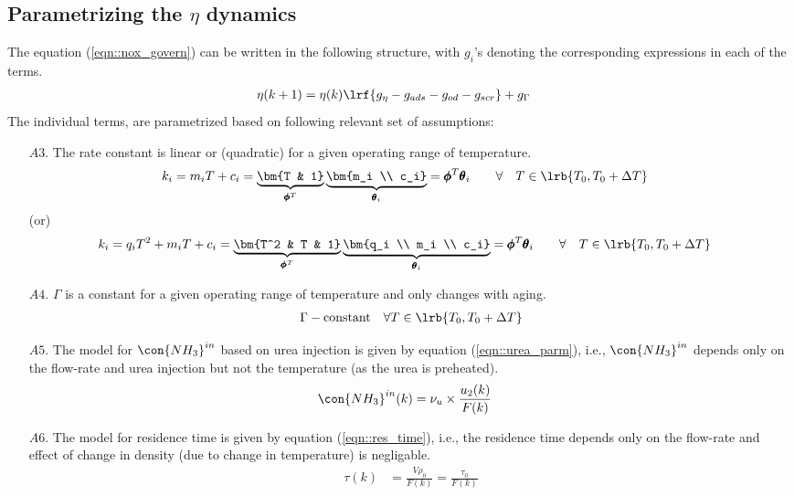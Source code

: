 \subsection{Parametrizing the $\eta$ dynamics}
The equation (\ref{eqn::nox_govern}) can be written in the following structure, with $g_i$'s denoting the corresponding expressions in each of the terms.
\begin{align}
        \eta(k+1) &= \eta(k) \lrf{ g_{\eta} - g_{ads} - g_{od} - g_{scr}} + g_\Gamma
\end{align}
The individual terms, are parametrized based on following relevant set of assumptions:
\begin{itemize}
        \item[$A3.$] The rate constant is linear or (quadratic) for a given operating range of temperature.
        \begin{align}
                k_i &= m_i T + c_i = \underbrace{\bm{T & 1}}_{\pmb \phi^T} \underbrace{\bm{m_i \\ c_i}}_{\pmb \theta_i}
                        = \pmb \phi^{T} \pmb \theta_i
                \qquad \forall \quad T \in \lrb{T_0, T_0 + \Delta T}
                \label{eqn::k_mdl}
        \end{align}
        (or)
        \begin{align}
                k_i &= q_iT^2 + m_i T + c_i = \underbrace{\bm{T^2 & T & 1}}_{\pmb \phi^T} \underbrace{\bm{q_i \\ m_i \\ c_i}}_{\pmb \theta_i}
                        = \pmb \phi^{T} \pmb \theta_i
                \qquad \forall \quad T \in \lrb{T_0, T_0 + \Delta T}
        \end{align}
        \item[$A4.$] $\Gamma$ is a constant for a given operating range of temperature and only changes with aging.
        \begin{align}
                \Gamma - \text{constant} \quad \forall T \in \lrb{T_0, T_0 + \Delta T}
                \label{eqn::gamma_mdl}
        \end{align}
        \item[$A5.$] The model for $\con{NH_3}^{in}$ based on urea injection is given by equation (\ref{eqn::urea_parm}), i.e., $\con{NH_3}^{in}$ depends only on the flow-rate and urea injection but not the temperature (as the urea is preheated).
        \begin{align}
                \con{NH_3}^{in}(k) &= \nu_u \times \frac{u_2(k)}{F(k)}
                \label{eqn::urea_mdl}
        \end{align}
        \item[$A6.$] The model for residence time is given by equation (\ref{eqn::res_time}), i.e., the residence time depends only on the flow-rate and effect of change in density (due to change in temperature) is negligable.
        \begin{align}
                \tau(k) &= \frac{V \rho_0}{F(k)} = \frac{\tau_0}{F(k)}
                \label{eqn::residence_time_mdl}
        \end{align}
\end{itemize}

